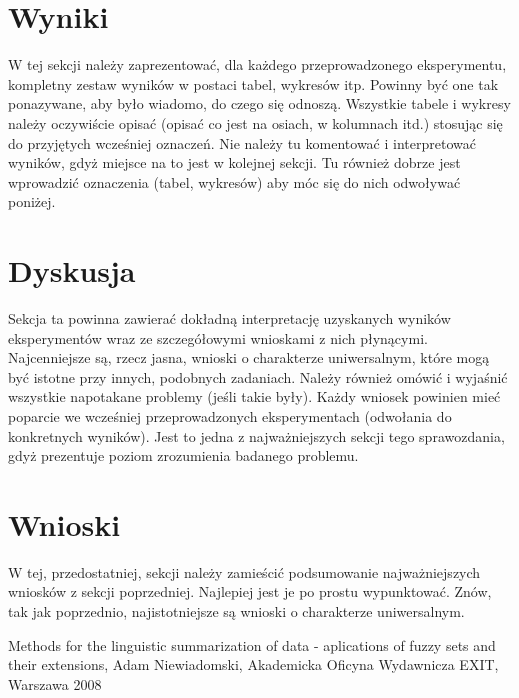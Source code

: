 \documentclass{classrep}
\begin{document}
	\section{Wyniki}
	{\color{blue}
		W tej sekcji należy zaprezentować, dla każdego przeprowadzonego eksperymentu,
		kompletny zestaw wyników w postaci tabel, wykresów itp. Powinny być one tak
		ponazywane, aby było wiadomo, do czego się odnoszą. Wszystkie tabele i wykresy
		należy oczywiście opisać (opisać co jest na osiach, w kolumnach itd.) stosując
		się do przyjętych wcześniej oznaczeń. Nie należy tu komentować i interpretować
		wyników, gdyż miejsce na to jest w kolejnej sekcji. Tu również dobrze jest
		wprowadzić oznaczenia (tabel, wykresów) aby móc się do nich odwoływać
		poniżej.}
	
	\section{Dyskusja}
	{\color{blue}
		Sekcja ta powinna zawierać dokładną interpretację uzyskanych wyników
		eksperymentów wraz ze szczegółowymi wnioskami z nich płynącymi. Najcenniejsze
		są, rzecz jasna, wnioski o charakterze uniwersalnym, które mogą być istotne
		przy innych, podobnych zadaniach. Należy również omówić i wyjaśnić wszystkie
		napotakane problemy (jeśli takie były). Każdy wniosek powinien mieć poparcie
		we wcześniej przeprowadzonych eksperymentach (odwołania do konkretnych
		wyników). Jest to jedna z najważniejszych sekcji tego sprawozdania, gdyż
		prezentuje poziom zrozumienia badanego problemu.}
	\section{Wnioski}
	{\color{blue}W tej, przedostatniej, sekcji należy zamieścić podsumowanie
		najważniejszych wniosków z sekcji poprzedniej. Najlepiej jest je po prostu
		wypunktować. Znów, tak jak poprzednio, najistotniejsze są wnioski o
		charakterze uniwersalnym.}
	
	
	\begin{thebibliography}{}
		Methods for the linguistic summarization of data - aplications of fuzzy sets and their extensions, Adam Niewiadomski, Akademicka Oficyna Wydawnicza EXIT, Warszawa 2008
	\end{thebibliography}
\end{document}
